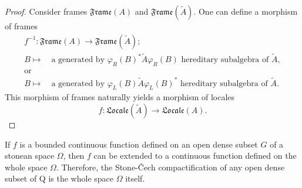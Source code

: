 \documentclass{beamer}
\theoremstyle{plain}
\newcommand{\be}{\begin{equation}}
\newcommand{\ee}{\end{equation}}
\newcommand{\Om}{\Omega}
\begin{document}
\begin{frame}
\begin{proof}
	Consider frames $\mathfrak{Frame}\left(  A\right)$ and   $\mathfrak{Frame}\left( \widetilde A\right)$. One can define a morphism of frames
	\be
	\begin{split}
		f^{-1}:\mathfrak{Frame}\left(  A\right)\to \mathfrak{Frame}\left( \widetilde A\right);\\
		B \mapsto \quad \text{a generated by } \varphi_R\left(B \right)^*\widetilde{A} \varphi_R\left(B \right) \text{ hereditary subalgebra of } \widetilde A,\\
		\text{or}\\ B \mapsto \quad \text{a generated by } \varphi_L\left(B \right)\widetilde{A} \varphi_L\left(B \right)^* \text{ hereditary subalgebra of } \widetilde A.
	\end{split}
	\ee
This morphism  of frames naturally yields  a morphism of locales
	$$
	f: \mathfrak{Locale}\left( \widetilde A\right)\to\mathfrak{Locale}\left( A\right).
	$$
	
\end{proof}
\end{frame}


\begin{frame}
\begin{lemma}
If $f$ is a bounded continuous function defined on an open dense 
subset $G$ of a stonean space $\Om$, then $f$ can be extended to a continuous function 
defined on the whole space $\Om$. Therefore, the Stone-\v{C}ech compactification 
of any open dense subset of Q is the whole space $\Om$ itself. 
\end{lemma}


\end{frame}
\end{document}
